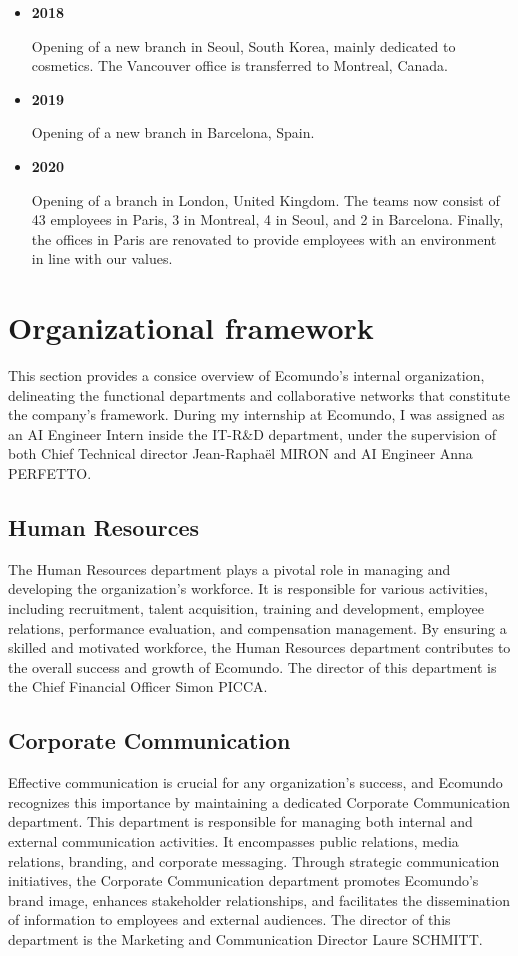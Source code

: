 \documentclass[a4paper,12pt,twoside]{report}
\begin{document}
\begin{itemize}
\item \textbf{2018}

Opening of a new branch in Seoul, South Korea, mainly dedicated to cosmetics. The Vancouver office is transferred to Montreal, Canada.

\item \textbf{2019}

Opening of a new branch in Barcelona, Spain.

\item \textbf{2020}

Opening of a branch in London, United Kingdom. The teams now consist of 43 employees in Paris, 3 in Montreal, 4 in Seoul, and 2 in Barcelona. Finally, the offices in Paris are renovated to provide employees with an environment in line with our values.
\end{itemize}
\section{Organizational framework}
This section provides a consice overview of Ecomundo's internal organization, delineating the functional departments and collaborative networks that constitute the company's framework.
During my internship at Ecomundo, I was assigned as an AI Engineer Intern inside the  IT-R\&D department, under the supervision of both Chief Technical director Jean-Raphaël MIRON and AI Engineer Anna PERFETTO.
\subsection{Human Resources}

The Human Resources department plays a pivotal role in managing and developing the organization's workforce. It is responsible for various activities, including recruitment, talent acquisition, training and development, employee relations, performance evaluation, and compensation management. By ensuring a skilled and motivated workforce, the Human Resources department contributes to the overall success and growth of Ecomundo. The director of this department is the Chief Financial Officer Simon PICCA.

\subsection{Corporate Communication}

Effective communication is crucial for any organization's success, and Ecomundo recognizes this importance by maintaining a dedicated Corporate Communication department. This department is responsible for managing both internal and external communication activities. It encompasses public relations, media relations, branding, and corporate messaging. Through strategic communication initiatives, the Corporate Communication department promotes Ecomundo's brand image, enhances stakeholder relationships, and facilitates the dissemination of information to employees and external audiences. The director of this department is the Marketing and Communication Director Laure SCHMITT.
\end{document}
